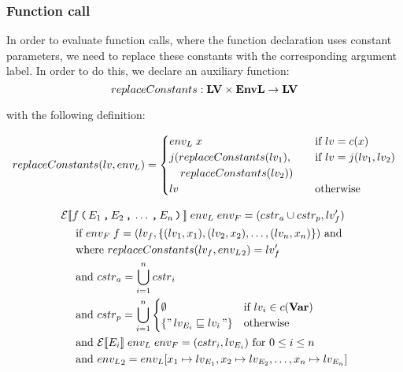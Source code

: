 \subsubsection{Function call}
In order to evaluate function calls, where the function declaration uses constant parameters, we need to replace these constants with the corresponding argument label.
In order to do this, we declare an auxiliary function:
\[ replaceConstants : \mathbf{LV} \times \mathbf{EnvL} \rightarrow \mathbf{LV} \]

with the following definition:

\[replaceConstants(lv, {env_L}) = \begin{cases}
  {env_L} \; x & \quad \text{if } lv = c(x) \\
  j(replaceConstants(lv_1), & \quad \text{if } lv = j(lv_1, lv_2) \\
  \quad replaceConstants(lv_2)) & \\
  lv & \quad \text{otherwise}
\end{cases} \]

\begin{align*}
& \mathcal{E}[\![ f \, \texttt{(} \, E_1 \, \texttt{,} \, E_2 \, \texttt{,} \, \dots \, \texttt{,} \, E_n \, \texttt{)} \, ]\!] \; {env_L} \; {env_F} = (cstr_a \cup cstr_p, lv_f') \\
& \quad \text{ if } {env_F} \; f = (lv_f, \{(lv_1, x_1), (lv_2, x_2), \dots, (lv_n, x_n)\}) \text{ and} \\
& \quad \text{ where } replaceConstants(lv_f, {env_L}_2) = lv_f' \\
& \quad \text{ and } {cstr}_a = \bigcup\limits_{i=1}^n {cstr}_i \\
& \quad \text{ and } {cstr}_p = \bigcup\limits_{i=1}^n
  \begin{cases}
    \emptyset &\text{if } lv_i \in c(\mathbf{Var})\\
    \{ "\,lv_{E_i} \sqsubseteq lv_i\," \} & \text{otherwise}
  \end{cases} \\
& \quad \text{ and } \mathcal{E}[\![ E_i ]\!] \; {env_L} \; {env_F} = (cstr_i, lv_{E_i}) \text{ for } 0 \leq i \leq n \\
& \quad \text{ and } {env_L}_2 = {env_L}[x_1 \mapsto lv_{E_1}, x_2 \mapsto lv_{E_2}, \dots, x_n \mapsto lv_{E_n}]
\end{align*}
